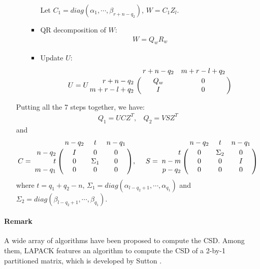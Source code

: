 \begin{enumerate}
\begin{enumerate}
\begin{itemize}
                                Let $C_1 = diag(\alpha_{1}, \cdots, \beta_{r+n-q_2})$, $W = C_1Z_{l}$.
                            \item QR decomposition of $W$:
                                \begin{align}
                                    W = Q_{w}R_{w}
                                \end{align}
                            \item Update $U$:
                                \begin{displaymath}
                                    U = U\bordermatrix{ & r+n-q_2 & m+r-l+q_2\cr
                                    \hfill r+n-q_2 & Q_{w} & 0 \cr
                                    \hfill m+r-l+q_2 & I & 0}
                                \end{displaymath}
                        \end{itemize}
            \end{enumerate}
    Putting all the 7 steps together, we have:
    \begin{align}
                Q_1 = UCZ^{T}, \ \ \ \ Q_2 = VSZ^{T}
            \end{align}
            and
            \begin{displaymath}
                C = \bordermatrix{ & n-q_2 & t & n-q_1 \cr
                \hfill n-q_2 & I & 0 & 0 \cr
                \hfill t & 0 & \Sigma_1 & 0 \cr
                \hfill m-q_1 & 0 & 0 & 0}, \  \ \ \
                S = \bordermatrix{ & n-q_2 & t & n-q_1 \cr
                \hfill t & 0 & \Sigma_2 & 0 \cr
                \hfill n-m & 0 & 0 & I \cr
                \hfill p-q_2 & 0 & 0 & 0}
        \end{displaymath}
        where $t = q_1 + q_2 - n$, $\Sigma_1 = diag(\alpha_{l-q_2+1}, \cdots, \alpha_{q_1})$ and $\Sigma_2 = diag(\beta_{l-q_2+1}, \cdots, \beta_{q_1})$.
    \end{enumerate}
    
    \paragraph{Remark} A wide array of algorithms have been proposed to compute the CSD. 
    Among them, LAPACK features an algorithm to compute the CSD of a 2-by-1 partitioned matrix, which is developed by Sutton \cite{sutton2009computing}.  
    
